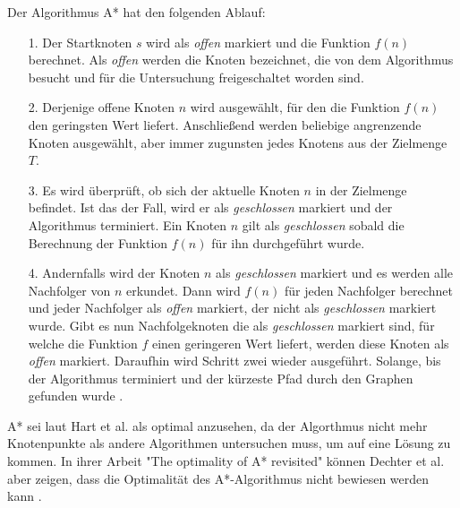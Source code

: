 Der Algorithmus A* hat den folgenden Ablauf:
\begin{itemize}
\item[1.] Der Startknoten $s$ wird als \textit{offen} markiert und die Funktion $f(n)$ berechnet. Als \textit{offen} werden die Knoten bezeichnet, die von dem Algorithmus besucht und für die Untersuchung freigeschaltet worden sind.
\item[2.] Derjenige offene Knoten $n$ wird ausgewählt, für den die Funktion $f(n)$
den geringsten Wert liefert. Anschließend werden beliebige angrenzende Knoten ausgewählt, aber immer zugunsten jedes Knotens aus der Zielmenge $T$.
\item[3.] Es wird überprüft, ob sich der aktuelle Knoten $n$ in der Zielmenge befindet. Ist das der Fall, wird er als \textit{geschlossen} markiert und der Algorithmus terminiert. Ein Knoten $n$ gilt als \textit{geschlossen} sobald die Berechnung der Funktion $f(n)$ für ihn durchgeführt wurde.
\item[4.]
Andernfalls wird der Knoten $n$ als \textit{geschlossen} markiert und es werden alle Nachfolger von $n$ erkundet. Dann wird $f(n)$ für jeden Nachfolger berechnet und jeder Nachfolger als \textit{offen} markiert, der nicht als \textit{geschlossen} markiert wurde. Gibt es nun Nachfolgeknoten die als \textit{geschlossen} markiert sind, für welche die Funktion $f$ einen geringeren Wert liefert, werden diese Knoten als \textit{offen} markiert. Daraufhin wird Schritt zwei wieder ausgeführt. Solange, bis der Algorithmus terminiert und der kürzeste Pfad durch den Graphen gefunden wurde \cite{HartNilssonandRaphael.1968}.
\end{itemize}

A* sei laut Hart et al. \cite{HartNilssonandRaphael.1968} als optimal anzusehen, da der Algorthmus nicht mehr Knotenpunkte als andere Algorithmen untersuchen muss, um auf eine Lösung zu kommen. In ihrer Arbeit "The optimality of A* revisited" können Dechter et al. aber zeigen, dass die Optimalität des A*-Algorithmus nicht bewiesen werden kann \cite{RinaDechterandJudeaPearl.1983}.
